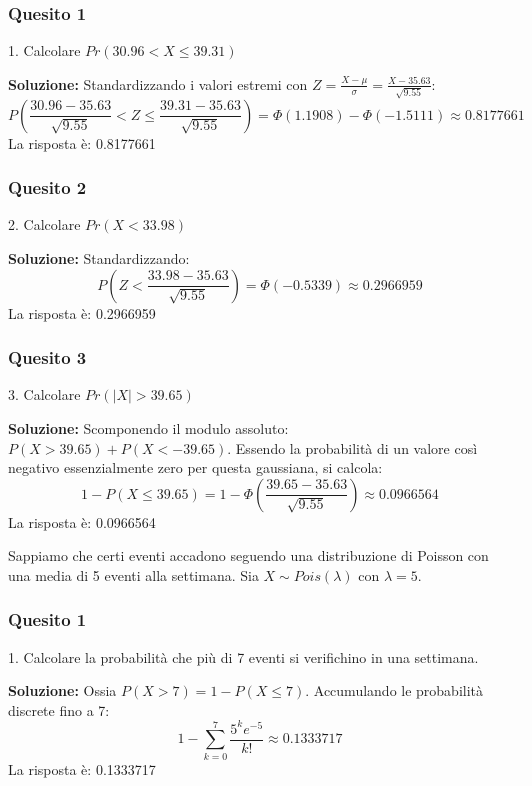 \documentclass[12pt, a4paper]{article}
\begin{document}
\subsubsection*{Quesito 1}
1. Calcolare $Pr(30.96 < X \leq 39.31)$

\textbf{Soluzione:}
Standardizzando i valori estremi con $Z = \frac{X - \mu}{\sigma} = \frac{X - 35.63}{\sqrt{9.55}}$:
$$ P\left(\frac{30.96 - 35.63}{\sqrt{9.55}} < Z \leq \frac{39.31 - 35.63}{\sqrt{9.55}}\right) = \Phi(1.1908) - \Phi(-1.5111) \approx 0.8177661 $$
La risposta è: 0.8177661

\subsubsection*{Quesito 2}
2. Calcolare $Pr(X < 33.98)$

\textbf{Soluzione:}
Standardizzando:
$$ P\left(Z < \frac{33.98 - 35.63}{\sqrt{9.55}}\right) = \Phi(-0.5339) \approx 0.2966959 $$
La risposta è: 0.2966959

\subsubsection*{Quesito 3}
3. Calcolare $Pr(|X| > 39.65)$

\textbf{Soluzione:}
Scomponendo il modulo assoluto: $P(X > 39.65) + P(X < -39.65)$. Essendo la probabilità di un valore così negativo essenzialmente zero per questa gaussiana, si calcola:
$$ 1 - P(X \leq 39.65) = 1 - \Phi\left(\frac{39.65 - 35.63}{\sqrt{9.55}}\right) \approx 0.0966564 $$
La risposta è: 0.0966564


\vspace{0.5cm}
\begin{tcolorbox}[colback=lightergray!10, colframe=tocsec, title=\textbf{Esercizio 10}]
Sappiamo che certi eventi accadono seguendo una distribuzione di Poisson con una media di 5 eventi alla settimana. Sia $X \sim Pois(\lambda)$ con $\lambda=5$.
\end{tcolorbox}

\subsubsection*{Quesito 1}
1. Calcolare la probabilità che più di 7 eventi si verifichino in una settimana.

\textbf{Soluzione:}
Ossia $P(X > 7) = 1 - P(X \leq 7)$. Accumulando le probabilità discrete fino a 7:
$$ 1 - \sum_{k=0}^7 \frac{5^k e^{-5}}{k!} \approx 0.1333717 $$
La risposta è: 0.1333717
\end{document}
